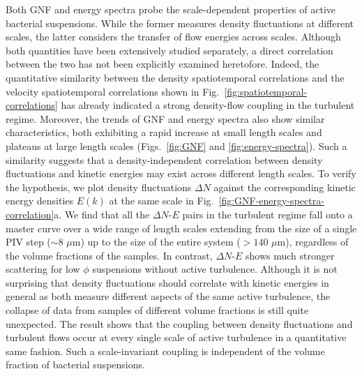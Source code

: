 \documentclass[twocolumn,aps,prx,amsmath,amssymb,longbibliography,superscriptaddress]{revtex4-2}
\begin{document}
Both GNF and energy spectra probe the scale-dependent properties of active bacterial suspensions. While the former measures density fluctuations at different scales, the latter considers the transfer of flow energies %
across scales. Although both quantities have been extensively studied separately, a direct correlation between the two has not been explicitly examined heretofore. Indeed, the quantitative similarity between the density spatiotemporal correlations and the velocity spatiotemporal correlations shown in Fig.~\ref{fig:spatiotemporal-correlations} has already indicated a strong density-flow coupling in the turbulent regime. Moreover, the trends of GNF and energy spectra also show similar characteristics, both exhibiting a rapid increase at small length scales and plateaus at large length scales (Figs.~\ref{fig:GNF} and \ref{fig:energy-spectra}). Such a similarity suggests that a density-independent correlation between density fluctuations and kinetic energies may exist across different length scales. To verify the hypothesis, we plot density fluctuations $\Delta N$ against the corresponding kinetic energy densities $E(k)$ at the same scale in Fig.~\ref{fig:GNF-energy-spectra-correlation}a. We find that all the $\Delta N$-$E$ pairs in the turbulent regime fall onto a master curve over a wide range of length scales extending from the size of a single PIV step ($\sim 8$ $\mu$m) up to the size of the entire system ($> 140$ $\mu$m), regardless of the volume fractions of the samples.
In contrast, $\Delta N$-$E$ shows much stronger scattering for low $\phi$ suspensions without active turbulence. Although it is not surprising that density fluctuations should correlate with kinetic energies in general as both measure different aspects of the same active turbulence, the collapse of data from samples of different volume fractions is still quite unexpected.
The result shows that the coupling between density fluctuations and turbulent flows occur at every single scale of active turbulence in a quantitative same fashion. Such a scale-invariant coupling is independent of the volume fraction of bacterial suspensions.
\end{document}
